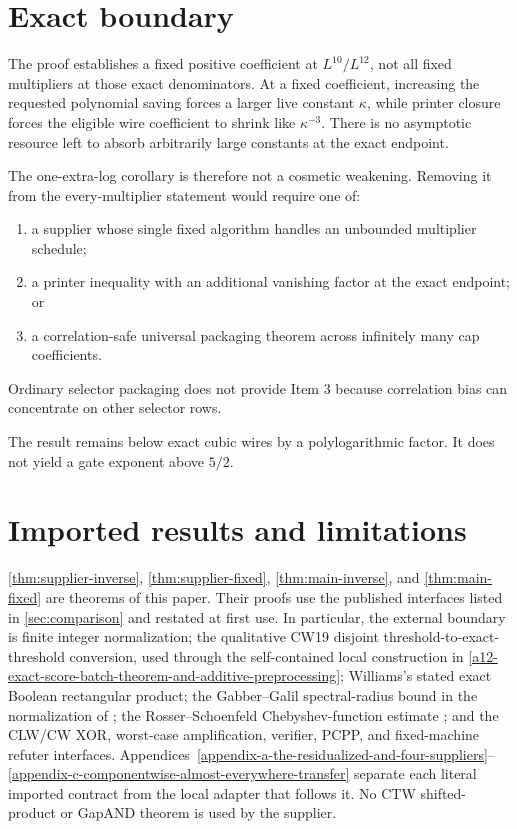 \documentclass[11pt,letterpaper]{article}
\newcommand{\cref}[1]{\ref{#1}}
\let\Cref\cref
\theoremstyle{definition}
\theoremstyle{remark}
\begin{document}
\section{Exact boundary}\label{8-exact-boundary}

The proof establishes a fixed positive coefficient at \(L^{10}/L^{12}\),
not all fixed multipliers at those exact denominators. At a fixed
coefficient, increasing the requested polynomial saving forces a larger
live constant \(\kappa\), while printer closure forces the eligible wire
coefficient to shrink like \(\kappa^{-3}\). There is no asymptotic
resource left to absorb arbitrarily large constants at the exact
endpoint.

The one-extra-log corollary is therefore not a cosmetic weakening.
Removing it from the every-multiplier statement would require one of:

\begin{enumerate}
\def\labelenumi{\arabic{enumi}.}
\item
  a supplier whose single fixed algorithm handles an unbounded
  multiplier schedule;
\item
  a printer inequality with an additional vanishing factor at the exact
  endpoint; or
\item
  a correlation-safe universal packaging theorem across infinitely many
  cap coefficients.
\end{enumerate}

Ordinary selector packaging does not provide Item 3 because correlation
bias can concentrate on other selector rows.

The result remains below exact cubic wires by a polylogarithmic factor.
It does not yield a gate exponent above \(5/2\).

\section{Imported results and limitations}\label{sec:limitations}

\Cref{thm:supplier-inverse}, \cref{thm:supplier-fixed},
\cref{thm:main-inverse}, and \cref{thm:main-fixed} are theorems of this
paper. Their proofs use the
published interfaces listed in \cref{sec:comparison} and restated at first use. In
particular, the external boundary is finite integer normalization; the
qualitative CW19 disjoint threshold-to-exact-threshold conversion, used
through the self-contained local construction in
\cref{a12-exact-score-batch-theorem-and-additive-preprocessing};
Williams's stated exact Boolean rectangular product; the
Gabber--Galil spectral-radius bound \cite{GG81} in the normalization of
\cite[Theorem 8.2]{HLW06}; the Rosser--Schoenfeld Chebyshev-function
estimate \cite[Theorem 4, eq. (3.14)]{RS62}; and the CLW/CW XOR, worst-case amplification,
verifier, PCPP, and fixed-machine refuter interfaces.
Appendices~\ref{appendix-a-the-residualized-and-four-suppliers}--\ref{appendix-c-componentwise-almost-everywhere-transfer}
separate each literal imported contract from the local adapter that
follows it. No CTW shifted-product or GapAND theorem is used by the
supplier.
\end{document}
